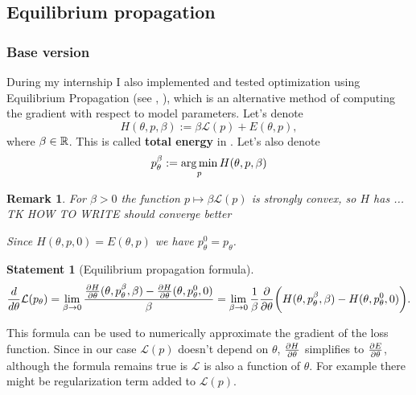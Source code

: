\documentclass[a4paper,10pt]{report}
\newtheorem{statement}{Statement}
\newtheorem{remark}{Remark}
\begin{document}
\subsection{ Equilibrium propagation}

\subsubsection{Base version}
During my internship I also implemented and tested optimization using Equilibrium Propagation (see \cite{eqprop}, \cite{zucchet2022beyond}), which is an alternative method of computing the gradient with respect to model parameters.
Let's denote
\begin{equation}
H(\theta, p, \beta) := \beta \mathcal{L}(p) + E(\theta, p),
\end{equation}
where $\beta \in \mathbb{R}$.
 This is called \textbf{total energy} in \cite{eqprop}. Let's also denote
\begin{equation}
p_{\theta}^{\beta}:=\operatorname*{arg\,min}_p H(\theta, p, \beta)
\end{equation}
\begin{remark}
 For $\beta>0$ the function $p \mapsto \beta \mathcal{L}(p)$ is strongly convex, so $H$ has ... TK HOW TO WRITE should converge better

 Since $H(\theta,p,0) = E(\theta,p)$ we have $p_{\theta}^{0}=p_{\theta}$.
 \end{remark}





\begin{statement}[Equilibrium propagation formula]
 \begin{equation}
 \frac{d}{d\theta} \mathcal{L}(p_\theta) = \lim_{\beta \to 0} \frac{\frac{\partial H}{\partial \theta}(\theta, p_\theta^\beta, \beta)-\frac{\partial H}{\partial \theta}(\theta, p_\theta^0, 0) }{\beta} = \lim_{\beta \to 0}\frac{1}{\beta} \frac{\partial }{\partial \theta} \bigg(H(\theta, p_\theta^\beta,\beta) - H(\theta, p_\theta^0, 0)\bigg).
\end{equation}
\end{statement}
This formula can be used to numerically approximate the gradient of the loss function.
Since in our case $\mathcal{L}(p)$ doesn't depend on $\theta$, $\frac{\partial H}{\partial \theta}$ simplifies to $\frac{\partial E}{\partial \theta}$, although the formula remains true is $\mathcal{L}$ is also a function of $\theta$. For example there might be regularization term added to $\mathcal{L}(p)$.
\end{document}
